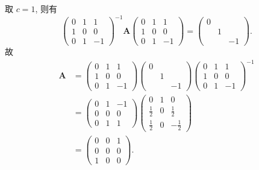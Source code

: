 \documentclass[../../main.tex]{subfiles}
\begin{document}
\begin{solution}
取 $c = 1$, 则有
$$
\begin{pmatrix} 0 & 1 & 1 \\ 1 & 0 & 0 \\ 0 & 1 & -1 \end{pmatrix}^{-1} \boldsymbol{A} \begin{pmatrix} 0 & 1 & 1 \\ 1 & 0 & 0 \\ 0 & 1 & -1 \end{pmatrix} = \begin{pmatrix} 0 & & \\ & 1 & \\ & & -1 \end{pmatrix}.
$$
故
$$
\begin{aligned}
\boldsymbol{A} &= \begin{pmatrix} 0 & 1 & 1 \\ 1 & 0 & 0 \\ 0 & 1 & -1 \end{pmatrix} \begin{pmatrix} 0 & & \\ & 1 & \\ & & -1 \end{pmatrix} \begin{pmatrix} 0 & 1 & 1 \\ 1 & 0 & 0 \\ 0 & 1 & -1 \end{pmatrix}^{-1} \\
&= \begin{pmatrix} 0 & 1 & -1 \\ 0 & 0 & 0 \\ 0 & 1 & 1 \end{pmatrix} \begin{pmatrix} 0 & 1 & 0 \\ \frac{1}{2} & 0 & \frac{1}{2} \\ \frac{1}{2} & 0 & -\frac{1}{2} \end{pmatrix} \\
&= \begin{pmatrix} 0 & 0 & 1 \\ 0 & 0 & 0 \\ 1 & 0 & 0 \end{pmatrix}.
\end{aligned}
$$

\end{solution}
\end{document}
